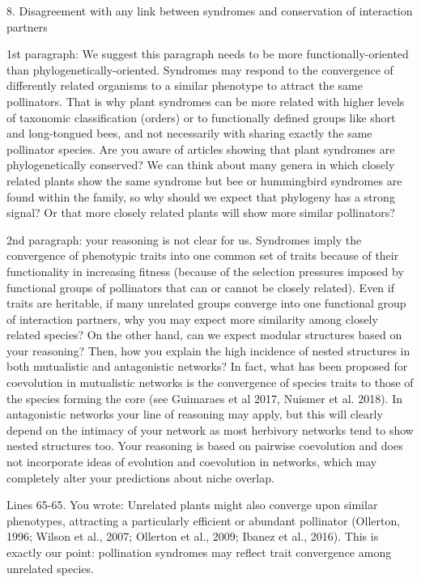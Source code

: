 \documentclass[12pt]{letter}
\newenvironment{refquote}{\bigskip \begin{it}}{\end{it}\smallskip}
\begin{document}
	8. Disagreement with any link between syndromes and conservation of interaction partners

		\begin{refquote}
			1st paragraph: We suggest this paragraph needs to be more functionally-oriented than phylogenetically-oriented. Syndromes may respond to the convergence of differently related organisms to a similar phenotype to attract the same pollinators. That is why plant syndromes can be more related with higher levels of taxonomic classification (orders) or to functionally defined groups like short and long-tongued bees, and not necessarily with sharing exactly the same pollinator species. Are you aware of articles showing that plant syndromes are phylogenetically conserved? We can think about many genera in which closely related plants show the same syndrome but bee or hummingbird syndromes are found within the family, so why should we expect that phylogeny has a strong signal? Or that more closely related plants will show more similar pollinators?
		\end{refquote}

		\begin{refquote}
			2nd paragraph: your reasoning is not clear for us. Syndromes imply the convergence of phenotypic traits into one common set of traits because of their functionality in increasing fitness (because of the selection pressures imposed by functional groups of pollinators that can or cannot be closely related). Even if traits are heritable, if many unrelated groups converge into one functional group of interaction partners, why you may expect more similarity among closely related species? On the other hand, can we expect modular structures based on your reasoning? Then, how you explain the high incidence of nested structures in both mutualistic and antagonistic networks? In fact, what has been proposed for coevolution in mutualistic networks is the convergence of species traits to those of the species forming the core (see Guimaraes et al 2017, Nuismer et al. 2018). In antagonistic networks your line of reasoning may apply, but this will clearly depend on the intimacy of your network as most herbivory networks tend to show nested structures too. Your reasoning is based on pairwise coevolution and does not incorporate ideas of evolution and coevolution in networks, which may completely alter your predictions about niche overlap.
		\end{refquote}

		\begin{refquote}
			Lines 65-65. You wrote: Unrelated plants might also converge upon similar phenotypes, attracting a particularly efficient or abundant pollinator (Ollerton, 1996; Wilson et al., 2007; Ollerton et al., 2009; Ibanez et al., 2016). This is exactly our point: pollination syndromes may reflect trait convergence among unrelated species.
		\end{refquote}
\end{document}

